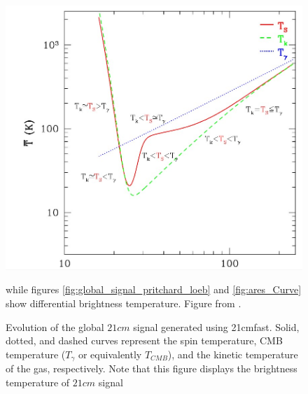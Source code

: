 \documentclass[12pt, TexShade, letterpaper]{report}
\begin{document}
\begin{figure}[h!]
    \centering
    \includegraphics[scale = 0.6]{21cm_curve.jpg}
    \caption[Evolution of the global $21cm$ signal generated using \gls{21cmfast}]{Evolution of the  global $21cm$ signal generated using \gls{21cmfast}. Solid, dotted, and dashed curves represent the spin temperature, CMB temperature ($T_\gamma$ or equivalently $T_{CMB}$), and the kinetic temperature of the gas, respectively. Note that this figure displays the brightness temperature of $21cm$ signal} while figures \ref{fig:global_signal_pritchard_loeb} and \ref{fig:ares_Curve} show differential brightness temperature. Figure from \cite{21cmfast_python}.
    \label{fig:21cmfast_curve}
\end{figure}
\end{document}
